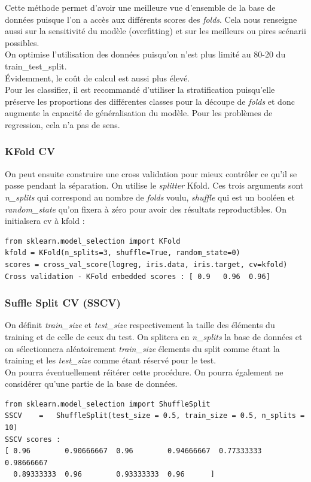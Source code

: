 \documentclass[a4paper,12pt]{report}
\newcommand{\rbk}[1]{\color{red}\textit{#1} \color{black}  
}
\newcommand\bk{\color{black}}
\numberwithin{equation}{section} %
\begin{document}
\noindent Cette méthode permet d'avoir une meilleure vue d'ensemble de la base de données puisque l'on a accès aux différents scores des \textit{folds}.
Cela nous renseigne aussi sur la sensitivité du modèle (overfitting) et sur les meilleurs ou pires scénarii possibles.\\
On optimise l'utilisation des données puisqu'on n'est plus limité au 80-20 du train\_test\_split.\\
Évidemment, le coût de calcul est aussi plus élevé. \\
Pour les classifier, il est recommandé d'utiliser la stratification puisqu'elle préserve les proportions des différentes classes pour la découpe de \textit{folds} et donc augmente la capacité de généralisation du modèle. Pour les problèmes de regression, cela n'a pas de sens.\\

\subsubsection{KFold CV}
On peut ensuite construire une cross validation pour mieux contrôler ce qu'il se passe pendant la séparation.
On utilise le \textit{splitter} Kfold. Ces trois arguments sont \color{red}\textit{n\_splits} \bk qui correspond au nombre de \textit{folds} voulu, \color{red} \textit{shuffle} \bk qui est un booléen et \color{red}\textit{random\_state} \bk qu'on fixera à zéro pour avoir des résultats reproductibles. On initialsera \color{red} cv \bk à kfold :
\begin{lstlisting}
from sklearn.model_selection import KFold
kfold = KFold(n_splits=3, shuffle=True, random_state=0)
scores = cross_val_score(logreg, iris.data, iris.target, cv=kfold)
Cross validation - KFold embedded scores : [ 0.9   0.96  0.96]
\end{lstlisting}

\subsubsection{Suffle Split CV (SSCV)}
On définit \rbk{train\_size} et \rbk{test\_size} respectivement la taille des éléments du training et de celle de ceux du test. On splitera en \rbk{n\_splits} la base de données et on sélectionnera aléatoirement \rbk{train\_size} élements du split comme étant la training  et les \rbk{test\_size} comme étant réservé pour le test.\\
On pourra éventuellement réitérer cette procédure. On pourra également ne considérer qu'une partie de la base de données.
\begin{lstlisting}
from sklearn.model_selection import ShuffleSplit
SSCV	=   ShuffleSplit(test_size = 0.5, train_size = 0.5, n_splits = 10)
SSCV scores : 
[ 0.96        0.90666667  0.96        0.94666667  0.77333333  0.98666667
  0.89333333  0.96        0.93333333  0.96      ]

\end{lstlisting}
\end{document}
